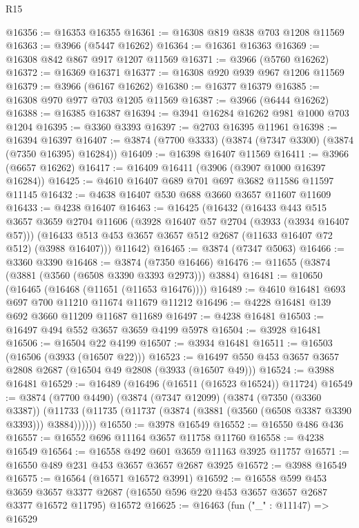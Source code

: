 \begin{lexlean}{R15}
\begin{coremodule}
@16356 := @16353 @16355
@16361 := @16308 @819 @838 @703 @1208 @11569
@16363 := @3966 (@5447 @16262)
@16364 := @16361 @16363
@16369 := @16308 @842 @867 @917 @1207 @11569
@16371 := @3966 (@5760 @16262)
@16372 := @16369 @16371
@16377 := @16308 @920 @939 @967 @1206 @11569
@16379 := @3966 (@6167 @16262)
@16380 := @16377 @16379
@16385 := @16308 @970 @977 @703 @1205 @11569
@16387 := @3966 (@6444 @16262)
@16388 := @16385 @16387
@16394 := @3941 @16284 @16262 @981 @1000 @703 @1204
@16395 := @3360 @3393
@16397 := @2703 @16395 @11961
@16398 := @16394 @16397
@16407 := @3874 (@7700 @3333) (@3874 (@7347 @3300) (@3874 (@7350 @16395) @16284))
@16409 := @16398 @16407 @11569
@16411 := @3966 (@6657 @16262)
@16417 := @16409 @16411 (@3906 (@3907 @1000 @16397 @16284))
@16425 := @4610 @16407 @689 @701 @697 @3682 @11586 @11597 @11145
@16432 := @4638 @16407 @530 @688 @3660 @3657 @11607 @11609
@16433 := @4238 @16407
@16463 := @16425
    (@16432
      (@16433
        @443
        @515
        @3657
        @3659
        @2704
        @11606
        (@3928 @16407 @57 @2704 (@3933 (@3934 @16407 @57)))
        (@16433 @513 @453 @3657 @3657 @512 @2687 (@11633 @16407 @72 @512) (@3988 @16407)))
      @11642)
@16465 := @3874 (@7347 @5063)
@16466 := @3360 @3390
@16468 := @3874 (@7350 @16466)
@16476 := @11655 (@3874 (@3881 (@3560 (@6508 @3390 @3393 @2973))) @3884)
@16481 := @10650 (@16465 (@16468 (@11651 (@11653 @16476))))
@16489 := @4610 @16481 @693 @697 @700 @11210 @11674 @11679 @11212
@16496 := @4228 @16481 @139 @692 @3660 @11209 @11687 @11689
@16497 := @4238 @16481
@16503 := @16497 @494 @552 @3657 @3659 @4199 @5978
@16504 := @3928 @16481
@16506 := @16504 @22 @4199
@16507 := @3934 @16481
@16511 := @16503 (@16506 (@3933 (@16507 @22)))
@16523 := @16497 @550 @453 @3657 @3657 @2808 @2687 (@16504 @49 @2808 (@3933 (@16507 @49)))
@16524 := @3988 @16481
@16529 := @16489 (@16496 (@16511 (@16523 @16524)) @11724)
@16549 := @3874
    (@7700 @4490)
    (@3874
      (@7347 @12099)
      (@3874
        (@7350 (@3360 @3387))
        (@11733 (@11735 (@11737 (@3874 (@3881 (@3560 (@6508 @3387 @3390 @3393))) @3884))))))
@16550 := @3978 @16549
@16552 := @16550 @486 @436
@16557 := @16552 @696 @11164 @3657 @11758 @11760
@16558 := @4238 @16549
@16564 := @16558 @492 @601 @3659 @11163 @3925 @11757
@16571 := @16550 @489 @231 @453 @3657 @3657 @2687 @3925
@16572 := @3988 @16549
@16575 := @16564 (@16571 @16572 @3991)
@16592 := @16558
    @599
    @453
    @3659
    @3657
    @3377
    @2687
    (@16550 @596 @220 @453 @3657 @3657 @2687 @3377 @16572 @11795)
    @16572
@16625 := @16463
    (fun ("_" : @11147) =>
    @16529

\end{coremodule}
\end{lexlean}

